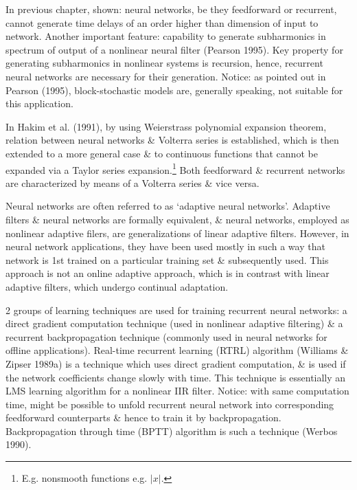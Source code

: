 \documentclass{article}
\begin{document}
\begin{enumerate}
\begin{itemize}
\begin{itemize}
			In previous chapter, shown: neural networks, be they feedforward or recurrent, cannot generate time delays of an order higher than dimension of input to network. Another important feature: capability to generate subharmonics in spectrum of output of a nonlinear neural filter (Pearson 1995). Key property for generating subharmonics in nonlinear systems is recursion, hence, recurrent neural networks are necessary for their generation. Notice: as pointed out in Pearson (1995), block-stochastic models are, generally speaking, not suitable for this application.
			
			In Hakim et al. (1991), by using Weierstrass polynomial expansion theorem, relation between neural networks \& Volterra series is established, which is then extended to a more general case \& to continuous functions that cannot be expanded via a Taylor series expansion.\footnote{E.g. nonsmooth functions e.g. $|x|$.} Both feedforward \& recurrent networks are characterized by means of a Volterra series \& vice versa.
			
			Neural networks are often referred to as `adaptive neural networks'. Adaptive filters \& neural networks are formally equivalent, \& neural networks, employed as nonlinear adaptive filers, are generalizations of linear adaptive filters. However, in neural network applications, they have been used mostly in such a way that network is 1st trained on a particular training set \& subsequently used. This approach is not an online adaptive approach, which is in contrast with linear adaptive filters, which undergo continual adaptation.
			
			2 groups of learning techniques are used for training recurrent neural networks: a direct gradient computation technique (used in nonlinear adaptive filtering) \& a recurrent backpropagation technique (commonly used in neural networks for offline applications). Real-time recurrent learning (RTRL) algorithm (Williams \& Zipser 1989a) is a technique which uses direct gradient computation, \& is used if the network coefficients change slowly with time. This technique is essentially an LMS learning algorithm for a nonlinear IIR filter. Notice: with same computation time, might be possible to unfold recurrent neural network into corresponding feedforward counterparts \& hence to train it by backpropagation. Backpropagation through time (BPTT) algorithm is such a technique (Werbos 1990).
			

\end{itemize}
\end{itemize}
\end{enumerate}
\end{document}
